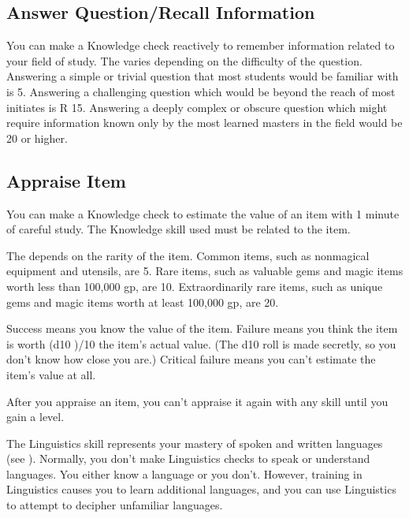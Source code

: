     \subsection{Answer Question/Recall Information}
        You can make a Knowledge check reactively to remember information related to your field of study. The  varies depending on the difficulty of the question. Answering a simple or trivial question that most students would be familiar with is  5. Answering a challenging question which would be beyond the reach of most initiates is R 15. Answering a deeply complex or obscure question which might require information known only by the most learned masters in the field would be  20 or higher.

    \subsection{Appraise Item}
        You can make a Knowledge check to estimate the value of an item with 1 minute of careful study. The Knowledge skill used must be related to the item.

        The  depends on the rarity of the item. Common items, such as nonmagical equipment and utensils, are  5. Rare items, such as valuable gems and magic items worth less than 100,000 gp, are  10. Extraordinarily rare items, such as unique gems and magic items worth at least 100,000 gp, are  20.

        Success means you know the value of the item. Failure means you think the item is worth (d10 )/10 \x the item's actual value. (The d10 roll is made secretly, so you don't know how close you are.) Critical failure means you can't estimate the item's value at all.

        After you appraise an item, you can't appraise it again with any skill until you gain a level.

\newpage
{}
        The Linguistics skill represents your mastery of spoken and written languages (see ).
        Normally, you don't make Linguistics checks to speak or understand languages.
        You either know a language or you don't.
        However, training in Linguistics causes you to learn additional languages, and you can use Linguistics to attempt to decipher unfamiliar languages.

